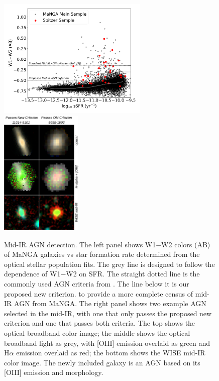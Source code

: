 \documentclass[12pt, preprint]{hacked-aastex}
\begin{document}
\begin{figure}[t!]
\includegraphics[width=0.64\textwidth]{w1w2-vs-ssfr.png}
\includegraphics[width=0.35\textwidth]{ir-grid.drawio.png}
  \vspace{-22pt}
    \caption{
\label{fig:wise} \small Mid-IR AGN detection. 
The left panel shows W1$-$W2 colors (AB) of MaNGA galaxies vs star
formation rate determined from the optical stellar population fits.
The grey line is designed to follow the dependence of W1$-$W2 on SFR.
The straight dotted line is the commonly used AGN criteria from
\cite{assef18a}. The line below it is our proposed new criterion.  to
provide a more complete census of mid-IR AGN from MaNGA. The right
panel shows two example AGN selected in the mid-IR, with one that only
passes the proposed new criterion and one that passes both
criteria. The top shows the optical broadband color image; the middle
shows the optical broadband light as grey, with [OIII] emission
overlaid as green and H$\alpha$ emission overlaid as red; the bottom
shows the WISE mid-IR color image. The newly included galaxy is an AGN
based on its [OIII] emission and morphology.}
\end{figure}
\end{document}
